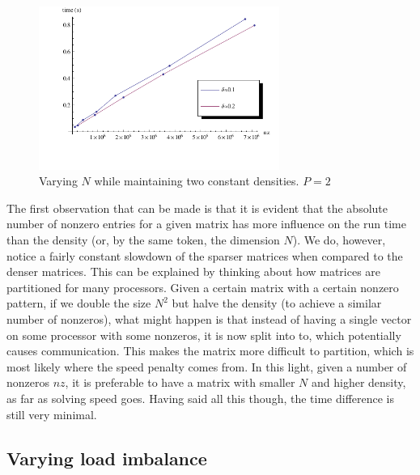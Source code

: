 \documentclass[a4paper]{article}
\newcommand{\plotsize}{0.7\textwidth}
\begin{document}
\begin{figure}[h]
    \begin{center}
        \includegraphics[width=\plotsize]{img/density-run.pdf}
    \end{center}
    \caption{Varying $N$ while maintaining two constant densities. $P=2$}
    \label{fig:density-run}
\end{figure}

The first observation that can be made is that it is evident that the absolute number of
nonzero entries for a given matrix has more influence on the run time than the density
(or, by the same token, the dimension $N$). We do, however, notice a fairly constant
slowdown of the sparser matrices when compared to the denser matrices. This can be explained
by thinking about how matrices are partitioned for many processors. Given a certain matrix with
a certain nonzero pattern, if we double the size $N^2$ but halve the density (to achieve a similar
number of nonzeros), what might happen is that instead of having a single vector on some processor
with some nonzeros, it is now split into to, which potentially causes communication. This makes the
matrix more difficult to partition, which is most likely where the speed penalty comes from. In this
light, given a number of nonzeros $nz$, it is preferable to have a matrix with smaller $N$ and higher
density, as far as solving speed goes. Having said all this though, the time difference is
still very minimal.

\subsection{Varying load imbalance}\label{sec:imbalance-run}
\end{document}
